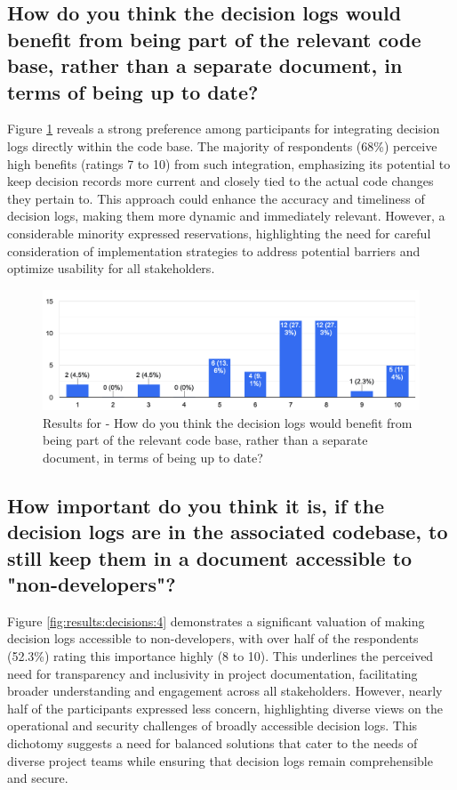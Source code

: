 \pagebreak

\subsection*{How do you think the decision logs would benefit from being part of the relevant code base, rather than a separate document, in terms of being up to date?}
Figure \ref{fig:results:decisions:3} reveals a strong preference among participants for integrating decision logs directly within the code base. The majority of respondents (68\%) perceive high benefits (ratings 7 to 10) from such integration, emphasizing its potential to keep decision records more current and closely tied to the actual code changes they pertain to. This approach could enhance the accuracy and timeliness of decision logs, making them more dynamic and immediately relevant. However, a considerable minority expressed reservations, highlighting the need for careful consideration of implementation strategies to address potential barriers and optimize usability for all stakeholders.

\begin{figure}[h!]
\centering
\includegraphics[width=\linewidth]{Images/Survey/decisions_3.png}
\caption{Results for - How do you think the decision logs would benefit from being part of the relevant code base, rather than a separate document, in terms of being up to date?}
\label{fig:results:decisions:3}
\end{figure}

\pagebreak

\subsection*{How important do you think it is, if the decision logs are in the associated codebase, to still keep them in a document accessible to "non-developers"?}
Figure \ref{fig:results:decisions:4} demonstrates a significant valuation of making decision logs accessible to non-developers, with over half of the respondents (52.3\%) rating this importance highly (8 to 10). This underlines the perceived need for transparency and inclusivity in project documentation, facilitating broader understanding and engagement across all stakeholders. However, nearly half of the participants expressed less concern, highlighting diverse views on the operational and security challenges of broadly accessible decision logs. This dichotomy suggests a need for balanced solutions that cater to the needs of diverse project teams while ensuring that decision logs remain comprehensible and secure.


